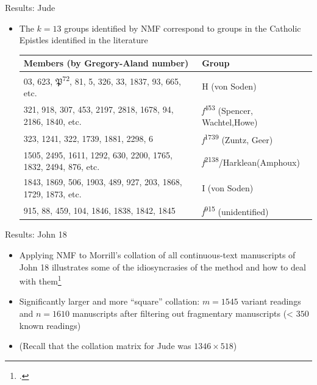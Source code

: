 \documentclass[10pt]{beamer}
\begin{document}
	\begin{frame}{Results: Jude}
		\begin{itemize}
			\item The $k = 13$ groups identified by NMF correspond to groups in the Catholic Epistles identified in the literature
			\begin{center}
				\matrixfont
				\footnotesize
				\begin{tabular}{p{2.5in}p{1.25in}}
					Members (by Gregory-Aland number) & Group\\
					\hline
					03, 623, $\mathfrak{P}$\textsuperscript{72}, 81, 5, 326, 33, 1837, 93, 665, etc. & Η (von Soden)\\
					\hline
					321, 918, 307, 453, 2197, 2818, 1678, 94, 2186, 1840, etc. & \emph{f}\textsuperscript{453} (Spencer, Wachtel,\newline Howe)\\
					\hline
					323, 1241, 322, 1739, 1881, 2298, 6 & \emph{f}\textsuperscript{1739} (Zuntz, Geer)\\
					\hline
					1505, 2495, 1611, 1292, 630, 2200, 1765, 1832, 2494, 876, etc. & \emph{f}\textsuperscript{2138}/Harklean\newline (Amphoux)\\
					\hline
					1843, 1869, 506, 1903, 489, 927, 203, 1868, 1729, 1873, etc. & Ι (von Soden)\\
					\hline
					915, 88, 459, 104, 1846, 1838, 1842, 1845 & \emph{f}\textsuperscript{915} (unidentified)
				\end{tabular}
			\end{center}
		\end{itemize}
	\end{frame}
	\begin{frame}{Results: John 18}
		\begin{itemize}
			\item Applying NMF to Morrill's collation of all continuous-text manuscripts of John 18 illustrates some of the idiosyncrasies of the method and how to deal with them\footnote{\cite{Morrill12}.}
			\item Significantly larger and more ``square'' collation: $m = 1545$ variant readings and $n = 1610$ manuscripts after filtering out fragmentary manuscripts (< $350$ known readings)
			\item (Recall that the collation matrix for Jude was $1346 \times 518$)
		\end{itemize}
	\end{frame}
\end{document}
